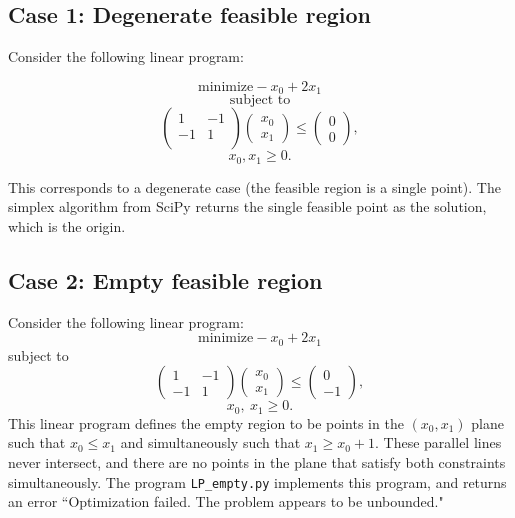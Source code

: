 \documentclass[12pt,english]{article}
\begin{document}
\subsection*{Case 1: Degenerate feasible region}

Consider the following linear program:

$$
\text{minimize} -x_0 + 2x_1
$$
$$
\text{subject to}
$$
$$
\left(
\begin{array}{cc}
1	&	-1 	\\
-1 	&	1     	\\
\end{array}
\right)
\left(
\begin{array}{c}
x_0 \\
x_1
\end{array}
\right)
\leq
\left(
\begin{array}{c}
0 \\
0
\end{array}
\right),
$$
$$
x_0, x_1 \geq 0.
$$

This corresponds to a degenerate case (the feasible region is a single point).  The simplex algorithm from SciPy returns the single feasible point as the solution, which is the origin.

\subsection*{Case 2: Empty feasible region}

Consider the following linear program:
$$
\text{minimize} -x_0 + 2x_1
$$
subject to
$$
\left(
\begin{array}{cc}
1	&	-1	\\
-1	&	1	
\end{array}
\right)
\left(
\begin{array}{c}
x_0 \\
x_1
\end{array}
\right)
\leq 
\left(
\begin{array}{c}
0 	\\
-1
\end{array}
\right),
$$
$$
x_0,~x_1 \geq 0.
$$
This linear program defines the empty region to be points in the $(x_0,x_1)$ plane such that $x_0 \leq x_1$ and simultaneously such that $x_1 \geq x_0 +1$.  These parallel lines never intersect, and there are no points in the plane that satisfy both constraints simultaneously.  The program \texttt{LP\_empty.py} implements this program, and returns an error ``Optimization failed. The problem appears to be unbounded." \\
\end{document}
